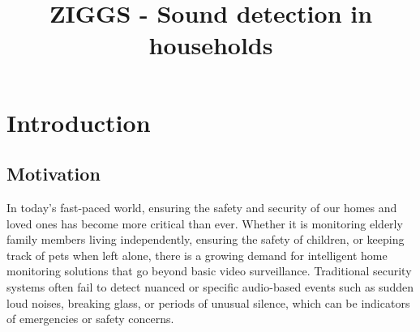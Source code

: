 \documentclass[conference]{IEEEtran}
\begin{document}
\title{ZIGGS - Sound detection in households}

\author{ 
\and 
{} 
\and 
{} 
\and 
{} 
}
\maketitle



\maketitle

\section{Introduction}
\subsection{Motivation}
In today’s fast-paced world, ensuring the safety and security of our homes and loved ones has become more critical than ever. Whether it is monitoring elderly family members living independently, ensuring the safety of children, or keeping track of pets when left alone, there is a growing demand for intelligent home monitoring solutions that go beyond basic video surveillance. Traditional security systems often fail to detect nuanced or specific audio-based events such as sudden loud noises, breaking glass, or periods of unusual silence, which can be indicators of emergencies or safety concerns.
\end{document}

